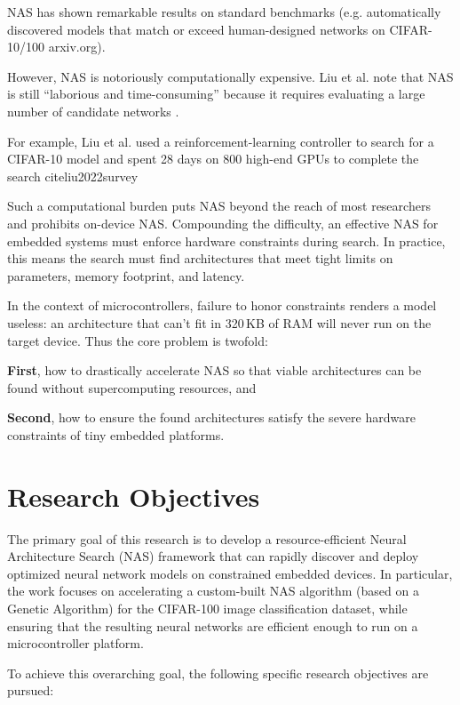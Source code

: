 NAS has shown remarkable results on standard benchmarks (e.g. automatically discovered models that match or exceed human-designed networks on CIFAR-10/100 arxiv.org).

However, NAS is notoriously computationally expensive. Liu et al. note that NAS is still “laborious and time-consuming” because it requires evaluating a large number of candidate networks \cite{liu2022survey} .

For example, Liu et al. used a reinforcement-learning controller to search for a CIFAR-10 model and spent 28 days on 800 high-end GPUs to complete the search
cite{liu2022survey} 

Such a computational burden puts NAS beyond the reach of most researchers and prohibits on-device NAS. Compounding the difficulty, an effective NAS for embedded systems must enforce hardware constraints during search. In practice, this means the search must find architectures that meet tight limits on parameters, memory footprint, and latency.

In the context of microcontrollers, failure to honor constraints renders a model useless: an architecture that can’t fit in 320 KB of RAM will never run on the target device. Thus the core problem is twofold: 

\textbf{First}, how to drastically accelerate NAS so that viable architectures can be found without supercomputing resources, and

\textbf{Second}, how to ensure the found architectures satisfy the severe hardware constraints of tiny embedded platforms.


\section{Research Objectives}

The primary goal of this research is to develop a resource-efficient Neural Architecture Search (NAS) framework that can rapidly discover and deploy optimized neural network models on constrained embedded devices. In particular, the work focuses on accelerating a custom-built NAS algorithm (based on a Genetic Algorithm) for the CIFAR-100 image classification dataset, while ensuring that the resulting neural networks are efficient enough to run on a microcontroller platform. 

To achieve this overarching goal, the following specific research objectives are pursued:

